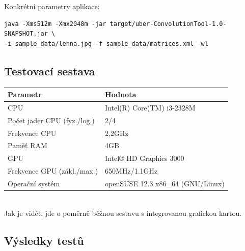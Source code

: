 \documentclass[10pt,a4paper]{article}
\begin{document}
Konkrétní parametry aplikace:

\begin{verbatim}
java -Xms512m -Xmx2048m -jar target/uber-ConvolutionTool-1.0-SNAPSHOT.jar \
-i sample_data/lenna.jpg -f sample_data/matrices.xml -wl
\end{verbatim}

\subsection{Testovací sestava}

\begin{tabular}{|p{5cm}||p{7cm}|}
	
	\hline
	\textbf{Parametr} & \textbf{Hodnota}	\\
	\hline
	\hline
	CPU & Intel(R) Core(TM) i3-2328M	\\
	\hline
	Počet jader CPU (fyz./log.) & 2/4	\\
	\hline
	Frekvence CPU & 2,2GHz	\\
	\hline
	Paměť RAM & 4GB	\\
	\hline
	GPU & Intel® HD Graphics 3000	\\
	\hline
	Frekvence GPU (zákl./max.) & 650MHz/1.1GHz	\\
	\hline
	Operační systém & openSUSE 12.3 x86\_64 (GNU/Linux) \\
	\hline
\end{tabular}\\[0.3cm]

Jak je vidět, jde o poměrně běžnou sestavu s integrovanou grafickou kartou.

\subsection{Výsledky testů}
\end{document}

